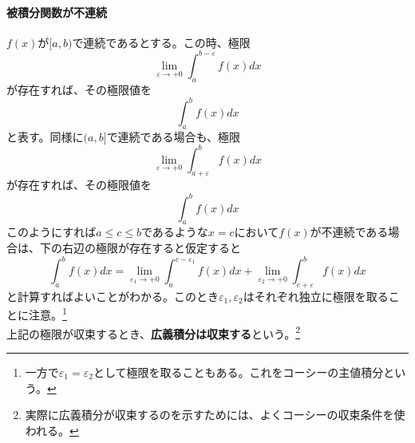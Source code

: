 \documentclass[a4j,dvipdfmx]{jsarticle}
\begin{document}
                \paragraph{被積分関数が不連続}
                    $f(x)$が$[a,b)$で連続であるとする。この時、極限
                    \begin{equation*}
                        \lim_{\varepsilon \to +0}\int_{a}^{b-\varepsilon}f(x)dx
                    \end{equation*}
                    が存在すれば、その極限値を
                    \begin{equation*}
                        \int_{a}^{b}f(x)dx
                    \end{equation*}
                    と表す。同様に$(a,b]$で連続である場合も、極限
                    \begin{equation*}
                        \lim_{\varepsilon\to +0}\int_{a+\varepsilon}^{b}f(x)dx
                    \end{equation*}
                    が存在すれば、その極限値を
                    \begin{equation*}
                        \int_{a}^{b}f(x)dx
                    \end{equation*}
                    このようにすれば$a\leq c \leq b$であるような$x=c$において$f(x)$が不連続である場合は、下の右辺の極限が存在すると仮定すると
                    \begin{equation*}
                        \int_{a}^{b}f(x)dx = \lim_{\varepsilon_1\to +0}\int_{a}^{c-\varepsilon_1}f(x)dx+\lim_{\varepsilon_2\to +0}\int_{c+\varepsilon}^{b}f(x)dx
                    \end{equation*}       
                    と計算すればよいことがわかる。このとき$\varepsilon_1,\varepsilon_2$はそれぞれ独立に極限を取ることに注意。\footnote{一方で$\varepsilon_1=\varepsilon_2$として極限を取ることもある。これをコーシーの主値積分という。}\\
                    上記の極限が収束するとき、\textbf{広義積分は収束する}という。\footnote{実際に広義積分が収束するのを示すためには、よくコーシーの収束条件を使われる。}\\
\end{document}
